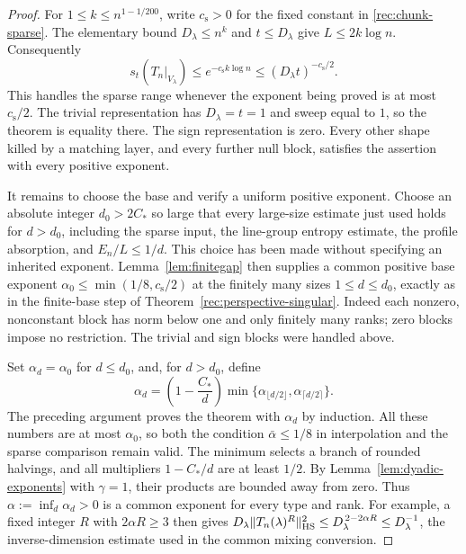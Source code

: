 \begin{proof}
For $1\le k\le n^{1-1/200}$, write $c_{\mathrm s}>0$
for the fixed constant in \eqref{rec:chunk-sparse}.
The elementary bound $D_\lambda\le n^k$ and $t\le D_\lambda$
give $L\le2k\log n$.  Consequently
\[
 s_t(T_n|_{V_\lambda})
 \le e^{-c_{\mathrm s}k\log n}
 \le (D_\lambda t)^{-c_{\mathrm s}/2}.
\]
This handles the sparse range whenever the exponent being
proved is at most $c_{\mathrm s}/2$.
The trivial representation has $D_\lambda=t=1$ and sweep
equal to $1$, so the theorem is equality there.
The sign representation is zero.  Every other shape killed
by a matching layer, and every further null block, satisfies
the assertion with every positive exponent.

It remains to choose the base and verify a uniform positive
exponent.  Choose an absolute integer $d_0>2C_*$ so large
that every large-size estimate just used holds for $d>d_0$,
including the sparse input, the line-group entropy estimate,
the profile absorption, and $E_n/L\le1/d$.
This choice has been made without specifying an inherited
exponent.  Lemma~\ref{lem:finitegap} then supplies a common positive base
exponent $\alpha_0\le\min(1/8,c_{\mathrm s}/2)$ at the finitely
many sizes $1\le d\le d_0$, exactly as in the finite-base step of
Theorem~\ref{rec:perspective-singular}. Indeed each nonzero,
nonconstant block has norm below one and only finitely many ranks;
zero blocks impose no restriction. The trivial and sign blocks
were handled above.

Set $\alpha_d=\alpha_0$ for $d\le d_0$, and, for $d>d_0$,
define
\[
 \alpha_d=
 \left(1-\frac{C_*}{d}\right)
 \min\{\alpha_{\lfloor d/2\rfloor},
                   \alpha_{\lceil d/2\rceil}\}.
\]
The preceding argument proves the theorem with $\alpha_d$
by induction.  All these numbers are at most $\alpha_0$,
so both the condition $\bar\alpha\le1/8$ in interpolation
and the sparse comparison remain valid.
The minimum selects a branch of rounded halvings, and all
multipliers $1-C_*/d$ are at least $1/2$. By
Lemma~\ref{lem:dyadic-exponents} with $\gamma=1$, their products
are bounded away from zero. Thus $\alpha:=\inf_d\alpha_d>0$
is a common exponent for every type and rank.
For example, a fixed integer $R$ with $2\alpha R\ge3$
then gives
$D_\lambda\|T_n(\lambda)^R\|_{\mathrm{HS}}^2
\le D_\lambda^{\,2-2\alpha R}\le D_\lambda^{-1}$,
the inverse-dimension estimate used in the common mixing
conversion.
\end{proof}
